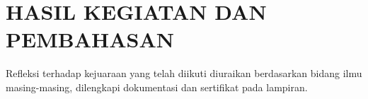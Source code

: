 \chapter{HASIL KEGIATAN DAN PEMBAHASAN}
Refleksi terhadap kejuaraan yang telah diikuti diuraikan berdasarkan bidang ilmu masing-masing,
dilengkapi dokumentasi dan sertifikat pada lampiran.

